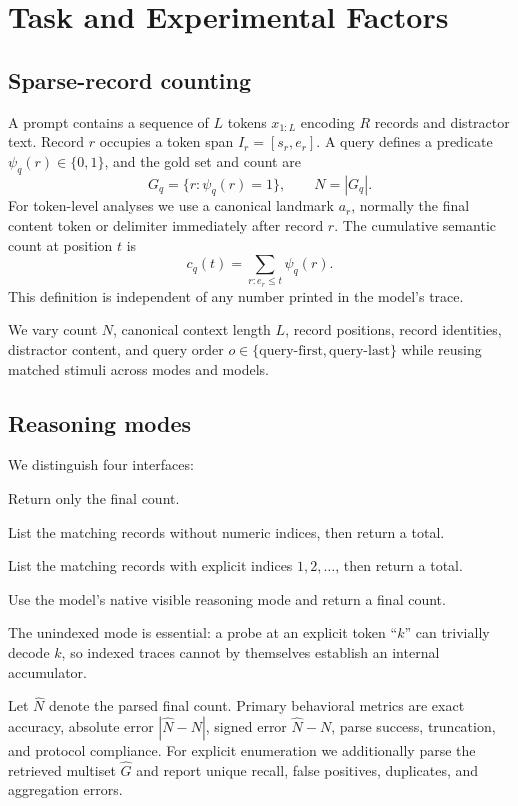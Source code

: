 \documentclass[10pt,twocolumn]{article}
\newcommand{\direct}{\textsc{Direct}}
\newcommand{\enumplain}{\textsc{Enum}}
\newcommand{\enumindex}{\textsc{Index-Enum}}
\newcommand{\native}{\textsc{Native-CoT}}
\begin{document}
\section{Task and Experimental Factors}
\subsection{Sparse-record counting}
A prompt contains a sequence of $L$ tokens $x_{1:L}$ encoding $R$ records and distractor text.
Record $r$ occupies a token span $I_r=[s_r,e_r]$. A query defines a predicate
$\psi_q(r)\in\{0,1\}$, and the gold set and count are
\[
    G_q=\{r:\psi_q(r)=1\},
    \qquad N=|G_q|.
\]
For token-level analyses we use a canonical landmark $a_r$, normally the final content token or
delimiter immediately after record $r$. The cumulative semantic count at position $t$ is
\[
    c_q(t)=\sum_{r:e_r\le t}\psi_q(r).
\]
This definition is independent of any number printed in the model's trace.

We vary count $N$, canonical context length $L$, record positions, record identities, distractor
content, and query order $o\in\{\text{query-first},\text{query-last}\}$ while reusing matched
stimuli across modes and models.

\subsection{Reasoning modes}
We distinguish four interfaces:
\begin{description}[style=nextline,font=\normalfont\scshape]
    \item[\direct] Return only the final count.
    \item[\enumplain] List the matching records without numeric indices, then return a total.
    \item[\enumindex] List the matching records with explicit indices $1,2,\ldots$, then return a total.
    \item[\native] Use the model's native visible reasoning mode and return a final count.
\end{description}
The unindexed mode is essential: a probe at an explicit token ``$k$'' can trivially decode $k$,
so indexed traces cannot by themselves establish an internal accumulator.

Let $\hat N$ denote the parsed final count. Primary behavioral metrics are exact accuracy,
absolute error $|\hat N-N|$, signed error $\hat N-N$, parse success, truncation, and protocol
compliance. For explicit enumeration we additionally parse the retrieved multiset
$\widehat G$ and report unique recall, false positives, duplicates, and aggregation errors.
\end{document}
